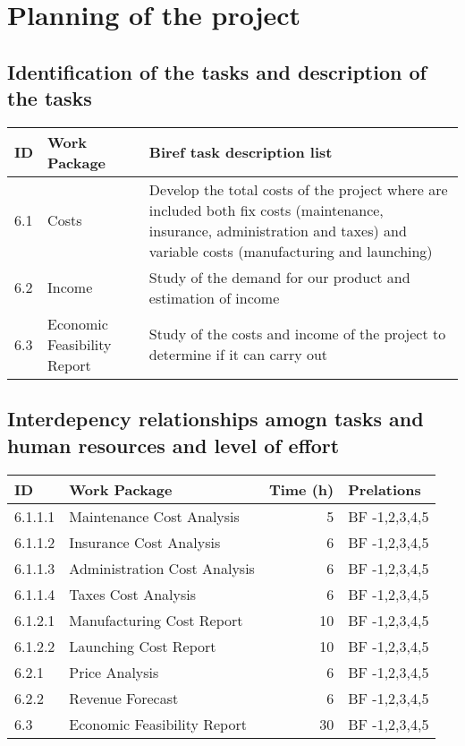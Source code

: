 \documentclass[12pt, titlepage]{article}
\begin{document}
\maketitle

\pagebreak


\section{Planning of the project}


\subsection{Identification of the tasks and description of the tasks}
\begin{tabular}{ | l | p{4cm} | p{8cm} |}
\hline
ID & Work Package & Biref task description list \\ \hline

6.1 & Costs & 

Develop the total costs of the project where are included both fix costs (maintenance, insurance, administration and taxes) and variable costs (manufacturing and launching) \\ 
\hline

6.2 & Income & 

Study of the demand for our product and estimation of income \\
 \hline

6.3 & Economic Feasibility Report & 
 Study of the costs and income of the project to determine if it can carry out \\ 
 \hline
\end{tabular}


\subsection{Interdepency relationships amogn tasks and human resources and level of effort}
\begin{tabular}{ | l | p{7cm} | r | p{3cm} | }
\hline
ID & Work Package & Time (h) & Prelations \\ \hline
6.1.1.1 & Maintenance Cost Analysis & 5 & BF -1,2,3,4,5 \\ \hline
6.1.1.2 & Insurance Cost Analysis & 6 & BF -1,2,3,4,5  \\ \hline
6.1.1.3 & Administration Cost Analysis & 6 & BF -1,2,3,4,5 \\ \hline
6.1.1.4 & Taxes Cost Analysis  & 6 & BF -1,2,3,4,5  \\ \hline
6.1.2.1 & Manufacturing Cost Report & 10 & BF -1,2,3,4,5  \\ \hline
6.1.2.2 & Launching Cost Report  & 10 & BF -1,2,3,4,5 \\ \hline
6.2.1 & Price Analysis & 6 & BF -1,2,3,4,5  \\ \hline
6.2.2 & Revenue Forecast & 6 & BF -1,2,3,4,5  \\ \hline
6.3 & Economic Feasibility Report & 30 & BF -1,2,3,4,5 \\ \hline

\end{tabular}
\end{document}
